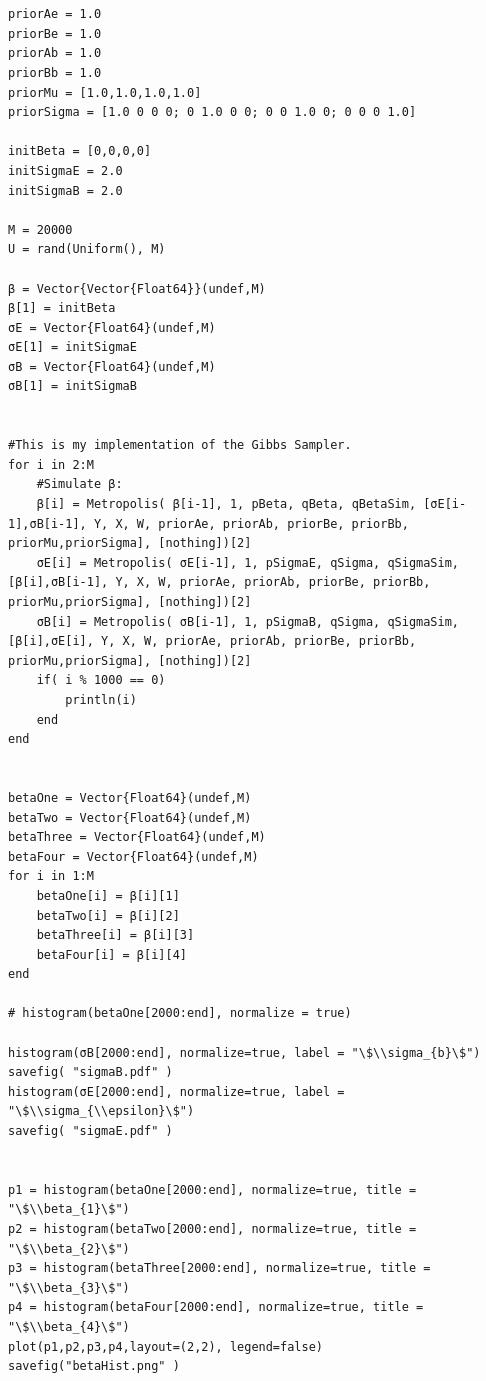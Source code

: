 \documentclass[12pt]{paper}
\begin{document}
\begin{verbatim}


priorAe = 1.0
priorBe = 1.0
priorAb = 1.0
priorBb = 1.0
priorMu = [1.0,1.0,1.0,1.0]
priorSigma = [1.0 0 0 0; 0 1.0 0 0; 0 0 1.0 0; 0 0 0 1.0]

initBeta = [0,0,0,0]
initSigmaE = 2.0
initSigmaB = 2.0

M = 20000
U = rand(Uniform(), M)

β = Vector{Vector{Float64}}(undef,M)
β[1] = initBeta
σE = Vector{Float64}(undef,M)
σE[1] = initSigmaE
σB = Vector{Float64}(undef,M)
σB[1] = initSigmaB


#This is my implementation of the Gibbs Sampler.
for i in 2:M
    #Simulate β:
    β[i] = Metropolis( β[i-1], 1, pBeta, qBeta, qBetaSim, [σE[i-1],σB[i-1], Y, X, W, priorAe, priorAb, priorBe, priorBb, priorMu,priorSigma], [nothing])[2]
    σE[i] = Metropolis( σE[i-1], 1, pSigmaE, qSigma, qSigmaSim, [β[i],σB[i-1], Y, X, W, priorAe, priorAb, priorBe, priorBb, priorMu,priorSigma], [nothing])[2]
    σB[i] = Metropolis( σB[i-1], 1, pSigmaB, qSigma, qSigmaSim, [β[i],σE[i], Y, X, W, priorAe, priorAb, priorBe, priorBb, priorMu,priorSigma], [nothing])[2]
    if( i % 1000 == 0)
        println(i)
    end
end


betaOne = Vector{Float64}(undef,M)
betaTwo = Vector{Float64}(undef,M)
betaThree = Vector{Float64}(undef,M)
betaFour = Vector{Float64}(undef,M)
for i in 1:M
    betaOne[i] = β[i][1]
    betaTwo[i] = β[i][2]
    betaThree[i] = β[i][3]
    betaFour[i] = β[i][4]
end

# histogram(betaOne[2000:end], normalize = true)

histogram(σB[2000:end], normalize=true, label = "\$\\sigma_{b}\$")
savefig( "sigmaB.pdf" )
histogram(σE[2000:end], normalize=true, label = "\$\\sigma_{\\epsilon}\$")
savefig( "sigmaE.pdf" )


p1 = histogram(betaOne[2000:end], normalize=true, title = "\$\\beta_{1}\$")
p2 = histogram(betaTwo[2000:end], normalize=true, title = "\$\\beta_{2}\$")
p3 = histogram(betaThree[2000:end], normalize=true, title = "\$\\beta_{3}\$")
p4 = histogram(betaFour[2000:end], normalize=true, title = "\$\\beta_{4}\$")
plot(p1,p2,p3,p4,layout=(2,2), legend=false)
savefig("betaHist.png" )
\end{verbatim}
\end{document}
